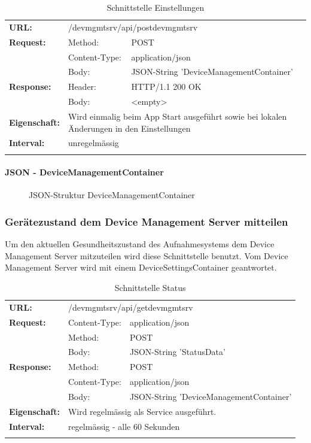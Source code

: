 {\renewcommand{\arraystretch}{1}
    \begin{longtable}{ p{2.5cm} p{3.5cm} p{6cm}}
	\textbf{URL:} & \multicolumn{2}{l}{/devmgmtsrv/api/postdevmgmtsrv} \\
	\textbf{Request:} & Method: & POST \\
		& Content-Type: & application/json \\
		& Body: & JSON-String 'DeviceManagementContainer'\\
	\textbf{Response:} &  Header: & HTTP/1.1 200 OK \\
		& Body: & <empty>	\\
	\textbf{Eigenschaft:} & \multicolumn{2}{p{10cm}}{Wird einmalig beim App Start ausgeführt sowie bei lokalen Änderungen in den Einstellungen} \\
	\textbf{Interval:} & \multicolumn{2}{p{10cm}}{unregelmässig} \\
	
\caption{Schnittstelle Einstellungen}
\end{longtable}}

\paragraph{JSON - DeviceManagementContainer}
\begin{figure}[H]
	\centering
	
	\caption{JSON-Struktur DeviceManagementContainer}
\end{figure}

\subsubsection{Gerätezustand dem Device Management Server mitteilen}

Um den aktuellen Gesundheitszustand des Aufnahmesystems dem Device Management Server mitzuteilen wird diese Schnittstelle benutzt. Vom Device Management Server wird mit einem DeviceSettingsContainer geantwortet.

{\renewcommand{\arraystretch}{1}
    \begin{longtable}{ p{2.5cm} p{3.5cm} p{6cm}} 
	\textbf{URL:} & \multicolumn{2}{l}{/devmgmtsrv/api/getdevmgmtsrv} \\
	\textbf{Request:} & Content-Type: & application/json \\
		& Method: & POST \\
		& Body: & JSON-String 'StatusData' \\
	\textbf{Response:} & Method: & POST \\
		& Content-Type: & application/json \\
		& Body: & JSON-String 'DeviceManagementContainer' \\
	\textbf{Eigenschaft:} & \multicolumn{2}{p{10cm}}{Wird regelmässig als Service ausgeführt.} \\ 
	\textbf{Interval:} & \multicolumn{2}{p{10cm}}{regelmässig - alle 60 Sekunden} \\
	
\caption{Schnittstelle Status}
\end{longtable}	}
